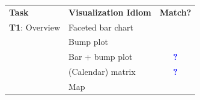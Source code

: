 \documentclass[journal]{vgtc}                %
\newcommand*\mismatch{\textcolor{red}{\ding{54}}}
\newcommand*\posmatch{\textcolor{blue}{{\bf ?}}}
\begin{document}
\begin{table}[ht]\renewcommand{\arraystretch}{1.2}\addtolength{\tabcolsep}{-1pt}
    \vspace{-.15cm}
    \begin{center}
    \scriptsize
    \begin{tabular}{l|l|c}

        \rowcolor{blue!15}
    
        {\bf Task} & {\bf Visualization Idiom} & {\bf Match?}
        
        \\
        
        {\bf T1}: Overview 
        
        & Faceted bar chart 
        
        & \mismatch
        
        \\
        
        \rowcolor{gray!15}
        
        
        & Bump plot 
        
        & \mismatch
        
        \\
        
        
        & Bar + bump plot 
        
        & \posmatch
        
        \\
        
        \rowcolor{gray!15}

        
        & (Calendar) matrix 
        
        & \posmatch
        
        \\
        
        
        & Map 
        
        & \mismatch
        
        \\
        

\end{tabular}
\end{center}
\end{table}
\end{document}
